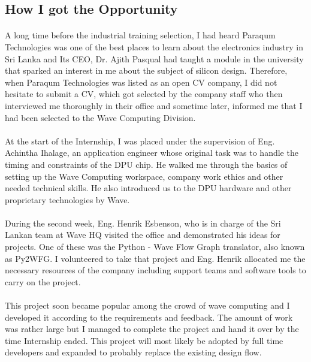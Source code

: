 
\subsection{How I got the Opportunity}

\paragraph{}
A long time before the industrial training selection, I had heard Paraqum Technologies was one of the best places to learn about the electronics industry in Sri Lanka and Its CEO, Dr. Ajith Pasqual had taught a module in the university that sparked an interest in me about the subject of silicon design. Therefore, when Paraqum Technologies was listed as an open CV company, I did not hesitate to submit a CV, which got selected by the company staff who then interviewed me thoroughly in their office and sometime later, informed me that I had been selected to the Wave Computing Division.

\paragraph{}
At the start of the Internship, I was placed under the supervision of Eng. Achintha Ihalage, an application engineer whose original task was to handle the timing and constraints of the DPU chip. He walked me through the basics of setting up the Wave Computing workspace, company work ethics and other needed technical skills. He also introduced us to the DPU hardware and other proprietary technologies by Wave. 

\paragraph{}
During the second week, Eng. Henrik Esbenson, who is in charge of the Sri Lankan team at Wave HQ visited the office and demonstrated his ideas for projects. One of these was the Python - Wave Flow Graph translator, also known as Py2WFG. I volunteered to take that project and Eng. Henrik allocated me the necessary resources of the company including support teams and software tools to carry on the project.

\paragraph{}
This project soon became popular among the crowd of wave computing and I developed it according to the requirements and feedback. The amount of work was rather large but I managed to complete the project and hand it over by the time Internship ended. This project will most likely be adopted by full time developers and expanded to probably replace the existing design flow.

